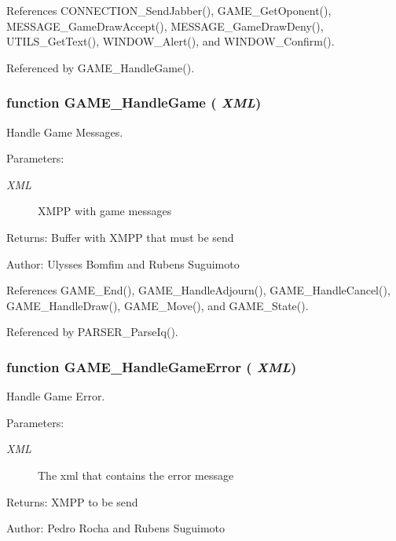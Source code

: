 References CONNECTION\_\-SendJabber(), GAME\_\-GetOponent(), MESSAGE\_\-GameDrawAccept(), MESSAGE\_\-GameDrawDeny(), UTILS\_\-GetText(), WINDOW\_\-Alert(), and WINDOW\_\-Confirm().

Referenced by GAME\_\-HandleGame().
\subsubsection[GAME\_\-HandleGame]{\setlength{\rightskip}{0pt plus 5cm}function GAME\_\-HandleGame ( {\em XML})}\label{game_2game_8js_d47fcc29b4d2240a47bd8bc183f88b72}


Handle Game Messages. 

\begin{Desc}
\item[Parameters:]
\begin{description}
\item[{\em XML}]XMPP with game messages \end{description}
\end{Desc}
\begin{Desc}
\item[Returns:]Buffer with XMPP that must be send \end{Desc}
\begin{Desc}
\item[Author:]Ulysses Bomfim and Rubens Suguimoto \end{Desc}


References GAME\_\-End(), GAME\_\-HandleAdjourn(), GAME\_\-HandleCancel(), GAME\_\-HandleDraw(), GAME\_\-Move(), and GAME\_\-State().

Referenced by PARSER\_\-ParseIq().
\subsubsection[GAME\_\-HandleGameError]{\setlength{\rightskip}{0pt plus 5cm}function GAME\_\-HandleGameError ( {\em XML})}\label{game_2game_8js_865985a861a92d6c67604d55addd09ac}


Handle Game Error. 

\begin{Desc}
\item[Parameters:]
\begin{description}
\item[{\em XML}]The xml that contains the error message \end{description}
\end{Desc}
\begin{Desc}
\item[Returns:]XMPP to be send \end{Desc}
\begin{Desc}
\item[Author:]Pedro Rocha and Rubens Suguimoto \end{Desc}


